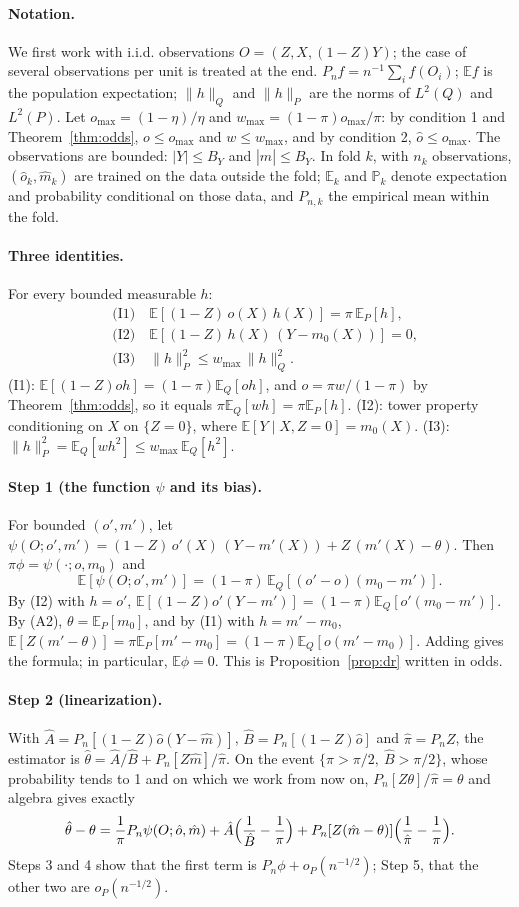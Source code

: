 \documentclass[11pt,a4paper]{article}
\newcommand{\E}{\mathbb{E}}
\newcommand{\PP}{\mathbb{P}}
\theoremstyle{plain}
\theoremstyle{definition}
\begin{document}
\paragraph{Notation.} We first work with i.i.d. observations $O=(Z,X,(1-Z)Y)$; the case of several observations per unit is treated at the end. $P_nf=n^{-1}\sum_if(O_i)$; $\E f$ is the population expectation; $\|h\|_Q$ and $\|h\|_P$ are the norms of $L^2(Q)$ and $L^2(P)$. Let $o_{\max}=(1-\eta)/\eta$ and $w_{\max}=(1-\pi)o_{\max}/\pi$: by condition 1 and Theorem~\ref{thm:odds}, $o\le o_{\max}$ and $w\le w_{\max}$, and by condition 2, $\hat o\le o_{\max}$. The observations are bounded: $|Y|\le B_Y$ and $|\hat m|\le B_Y$. In fold $k$, with $n_k$ observations, $(\hat o_k,\hat m_k)$ are trained on the data outside the fold; $\E_k$ and $\PP_k$ denote expectation and probability conditional on those data, and $P_{n,k}$ the empirical mean within the fold.

\paragraph{Three identities.} For every bounded measurable $h$:
\begin{align*}
&\text{(I1)}\quad \E[(1-Z)\,o(X)\,h(X)]=\pi\,\E_P[h],\\
&\text{(I2)}\quad \E[(1-Z)\,h(X)\,(Y-m_0(X))]=0,\\
&\text{(I3)}\quad \|h\|_P^2\le w_{\max}\,\|h\|_Q^2 .
\end{align*}
(I1): $\E[(1-Z)oh]=(1-\pi)\E_Q[oh]$, and $o=\pi w/(1-\pi)$ by Theorem~\ref{thm:odds}, so it equals $\pi\E_Q[wh]=\pi\E_P[h]$. (I2): tower property conditioning on $X$ on $\{Z=0\}$, where $\E[Y\mid X,Z=0]=m_0(X)$. (I3): $\|h\|_P^2=\E_Q[wh^2]\le w_{\max}\,\E_Q[h^2]$.

\paragraph{Step 1 (the function $\psi$ and its bias).} For bounded $(o',m')$, let $\psi(O;o',m')=(1-Z)\,o'(X)\,(Y-m'(X))+Z\,(m'(X)-\theta)$. Then $\pi\phi=\psi(\cdot;o,m_0)$ and
\[
\E[\psi(O;o',m')]=(1-\pi)\,\E_Q[(o'-o)(m_0-m')].
\]
By (I2) with $h=o'$, $\E[(1-Z)o'(Y-m')]=(1-\pi)\E_Q[o'(m_0-m')]$. By (A2), $\theta=\E_P[m_0]$, and by (I1) with $h=m'-m_0$, $\E[Z(m'-\theta)]=\pi\E_P[m'-m_0]=(1-\pi)\E_Q[o(m'-m_0)]$. Adding gives the formula; in particular, $\E\phi=0$. This is Proposition~\ref{prop:dr} written in odds.

\paragraph{Step 2 (linearization).} With $\hat A=P_n[(1-Z)\hat o(Y-\hat m)]$, $\hat B=P_n[(1-Z)\hat o]$ and $\hat\pi=P_nZ$, the estimator is $\hat\theta=\hat A/\hat B+P_n[Z\hat m]/\hat\pi$. On the event $\{\hat\pi>\pi/2,\ \hat B>\pi/2\}$, whose probability tends to 1 and on which we work from now on, $P_n[Z\theta]/\hat\pi=\theta$ and algebra gives exactly
\[
\hat\theta-\theta=\frac1\pi P_n\psi(O;\hat o,\hat m)+\hat A\Bigl(\frac1{\hat B}-\frac1\pi\Bigr)+P_n[Z(\hat m-\theta)]\Bigl(\frac1{\hat\pi}-\frac1\pi\Bigr).
\]
Steps 3 and 4 show that the first term is $P_n\phi+o_P(n^{-1/2})$; Step 5, that the other two are $o_P(n^{-1/2})$.
\end{document}

